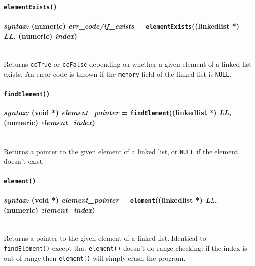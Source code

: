 \documentclass{article}
\begin{document}
\paragraph{\texttt{elementExists()}\\\\
\normalfont \emph{syntax: } (numeric) \emph{err\_code/if\_exists} = \texttt{elementExists}((linkedlist *) \emph{LL}, (numeric) \emph{index})\\\\}

Returns \verb#ccTrue# or \verb#ccFalse# depending on whether a given element of a linked list exists.  An error code is thrown if the \verb#memory# field of the linked list is \verb#NULL#.\\




\paragraph{\texttt{findElement()}\\\\
\normalfont \emph{syntax: } (void *) \emph{element\_pointer} = \texttt{findElement}((linkedlist *) \emph{LL}, (numeric) \emph{element\_index})\\\\}

Returns a pointer to the given element of a linked list, or \verb#NULL# if the element doesn't exist.\\




\paragraph{\texttt{element()}\\\\
\normalfont \emph{syntax: } (void *) \emph{element\_pointer} = \texttt{element}((linkedlist *) \emph{LL}, (numeric) \emph{element\_index})\\\\}

Returns a pointer to the given element of a linked list.  Identical to \verb#findElement()# except that \verb#element()# doesn't do range checking:  if the index is out of range then \texttt{element()} will simply crash the program.\\
\end{document}

